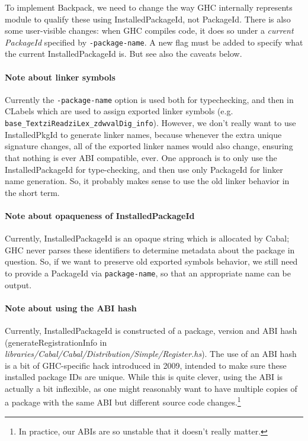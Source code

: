 \documentclass{article}
\newcommand{\ghcfile}[1]{\textsl{#1}}
\begin{document}
To implement Backpack, we need to change the way GHC internally represents
module to qualify these using InstalledPackageId, not PackageId.  There
is also some user-visible changes: when GHC compiles code, it does so
under a \emph{current PackageId} specified by \verb|-package-name|.  A
new flag must be added to specify what the current InstalledPackageId
is.  But see also the caveats below.

\paragraph{Note about linker symbols} Currently the \verb|-package-name|
option is used both for typechecking, and then in CLabels which are used
to assign exported linker symbols (e.g.
\verb|base_TextziReadziLex_zdwvalDig_info|).  However, we don't really
want to use InstalledPkgId to generate linker names, because whenever
the extra unique signature changes, all of the exported linker names
would also change, ensuring that nothing is ever ABI compatible, ever.
One approach is to only use the InstalledPackageId for type-checking,
and then use only PackageId for linker name generation.  So, it probably
makes sense to use the old linker behavior in the short term.

\paragraph{Note about opaqueness of InstalledPackageId}  Currently,
InstalledPackageId is an opaque string which is allocated by Cabal; GHC
never parses these identifiers to determine metadata about the package
in question.  So, if we want to preserve old exported symbols behavior,
we still need to provide a PackageId via \verb|package-name|, so that an
appropriate name can be output.

\paragraph{Note about using the ABI hash} Currently, InstalledPackageId
is constructed of a package, version and ABI hash
(generateRegistrationInfo in
\ghcfile{libraries/Cabal/Cabal/Distribution/Simple/Register.hs}).  The
use of an ABI hash is a bit of GHC-specific hack introduced in 2009,
intended to make sure these installed package IDs are unique.  While
this is quite clever, using the ABI is actually a bit inflexible, as one
might reasonably want to have multiple copies of a package with the same
ABI but different source code changes.\footnote{In practice, our ABIs
are so unstable that it doesn't really matter.}
\end{document}
